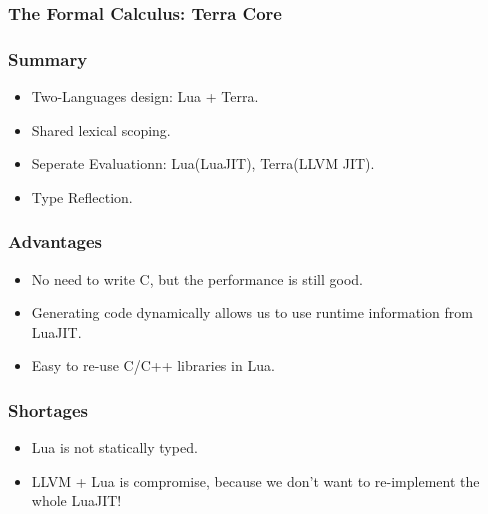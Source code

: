 \documentclass{beamer}
\begin{document}
\begin{frame}
	\frametitle{The Formal Calculus: Terra Core}
\end{frame}

\begin{frame}
	\frametitle{Summary}
  \begin{itemize}
  \item Two-Languages design: Lua + Terra.\pause
  \item Shared lexical scoping.\pause
  \item Seperate Evaluationn: Lua(LuaJIT), Terra(LLVM JIT).\pause
  \item Type Reflection.
  \end{itemize}
\end{frame}

\begin{frame}
	\frametitle{Advantages}
  \begin{itemize}
  \item No need to write C, but the performance is still good.\pause
  \item Generating code dynamically allows us to use runtime information from LuaJIT.\pause
  \item Easy to re-use C/C++ libraries in Lua.\pause
  \end{itemize}
\end{frame}

\begin{frame}
	\frametitle{Shortages}
  \begin{itemize}
  \item Lua is not statically typed.\pause
  \item LLVM + Lua is compromise, because we don't want to re-implement the whole LuaJIT!
  \end{itemize}
\end{frame}
\end{document}
